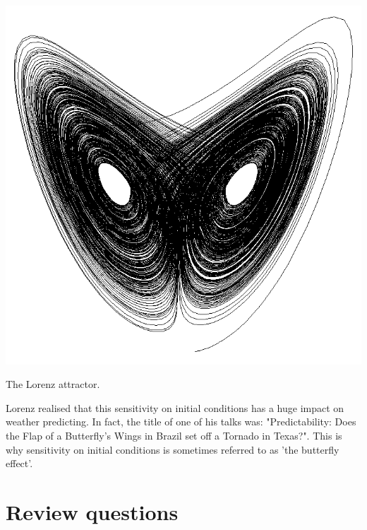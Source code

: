\begin{marginfigure}
\centering
\includegraphics{dynamic/figures/lorenz}
\caption{The Lorenz attractor.}
\label{fig-lorenz}
\end{marginfigure} 


Lorenz realised that this sensitivity on initial conditions has a huge impact on weather predicting. In fact, the title of one of his talks was: "Predictability: Does the Flap of a Butterfly's Wings in Brazil set off a Tornado in Texas?". This is why sensitivity on initial conditions is sometimes referred to as 'the butterfly effect'.

\pagebreak

\section*{Review questions}

